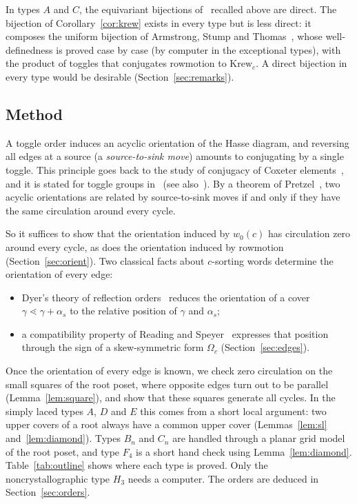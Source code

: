 \documentclass[11pt]{amsart}
\theoremstyle{definition}
\begin{document}
In types $A$ and $C$, the equivariant bijections of~\cite{DFISTW} recalled above are direct. The bijection of Corollary~\ref{cor:krew} exists in every type but is less direct: it composes the uniform bijection of Armstrong, Stump and Thomas~\cite{AST}, whose well-definedness is proved case by case (by computer in the exceptional types), with the product of toggles that conjugates rowmotion to $\mathrm{Krew}_c$. A direct bijection in every type would be desirable (Section~\ref{sec:remarks}).

\subsection{Method}
A toggle order induces an acyclic orientation of the Hasse diagram, and reversing all edges at a source (a \emph{source-to-sink move}) amounts to conjugating by a single toggle. This principle goes back to the study of conjugacy of Coxeter elements~\cite{Shi,EE,MM}, and it is stated for toggle groups in~\cite[\S3]{EFGJMPR} (see also~\cite{DMR}). By a theorem of Pretzel~\cite{Pretzel}, two acyclic orientations are related by source-to-sink moves if and only if they have the same circulation around every cycle.

So it suffices to show that the orientation induced by $w_0(c)$ has circulation zero around every cycle, as does the orientation induced by rowmotion (Section~\ref{sec:orient}). Two classical facts about $c$-sorting words determine the orientation of every edge:
\begin{itemize}
\item Dyer's theory of reflection orders~\cite{Dyer} reduces the orientation of a cover $\gamma\lessdot\gamma+\alpha_s$ to the relative position of $\gamma$ and $\alpha_s$;
\item a compatibility property of Reading and Speyer~\cite{RS} expresses that position through the sign of a skew-symmetric form $\Omega_c$ (Section~\ref{sec:edges}).
\end{itemize}
Once the orientation of every edge is known, we check zero circulation on the small squares of the root poset, where opposite edges turn out to be parallel (Lemma~\ref{lem:square}), and show that these squares generate all cycles. In the simply laced types $A$, $D$ and $E$ this comes from a short local argument: two upper covers of a root always have a common upper cover (Lemmas~\ref{lem:sl} and~\ref{lem:diamond}). Types $B_n$ and $C_n$ are handled through a planar grid model of the root poset, and type $F_4$ is a short hand check using Lemma~\ref{lem:diamond}. Table~\ref{tab:outline} shows where each type is proved. Only the noncrystallographic type $H_3$ needs a computer. The orders are deduced in Section~\ref{sec:orders}.
\end{document}

